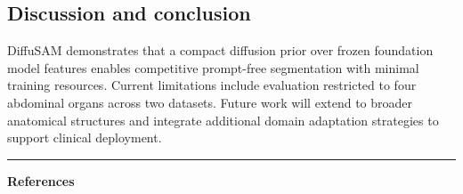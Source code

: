 \documentclass[11pt,a4paper]{article}
\begin{document}
\subsection*{Discussion and conclusion}
DiffuSAM demonstrates that a compact diffusion prior over frozen foundation model features enables competitive prompt-free segmentation with minimal training resources.
Current limitations include evaluation restricted to four abdominal organs across two datasets.
Future work will extend to broader anatomical structures and integrate additional domain adaptation strategies to support clinical deployment.

\bigskip
\hrule
\bigskip

{\large\bfseries References}
\end{document}
